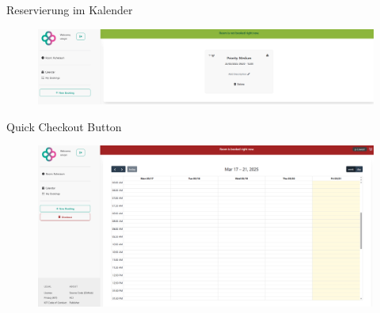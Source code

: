 \begin{frame}{Reservierung im Kalender}
    \thispagestyle{plain}
    \begin{figure}
        \centering
        \includegraphics[width=1\linewidth]{pictures/bookings_single.png}
        \label{fig:enter-label}
    \end{figure}
\end{frame}

\begin{frame}{Quick Checkout Button}
    \thispagestyle{plain}
    \begin{figure}
        \centering
        \includegraphics[width=1\linewidth]{pictures/check_out_button_light.png}
        \label{fig:enter-label}
    \end{figure}
\end{frame}
